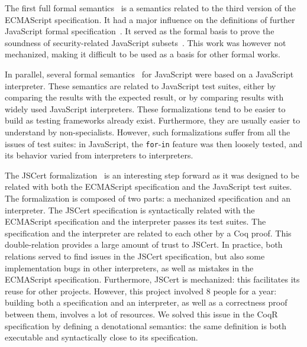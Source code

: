 \documentclass[
    sigplan,
    10pt,
    review, %
    natbib=false %
 ]{acmart}
\begin{document}
The first full formal semantics~\parencite{aplas08}
is a semantics related to the third version of the ECMAScript specification.
It had a major influence on the definitions of further JavaScript formal
specification~\parencite{ses, popl14jscert, popl12-Towards, usenix}.
It served as the formal basis to prove the soundness of security-related
JavaScript subsets~\parencite{MMT-CSF-TR09, mmt-esorics09, mmt-oakland10}.
This work was however not mechanized, making it difficult to be used
as a basis for other formal works.

In parallel, several formal semantics~\parencite{js-ml, Guha2010, Politz:S5, kjs}
for JavaScript were based on a JavaScript interpreter.
These semantics are related to JavaScript test suites,
either by comparing the results with the expected result,
or by comparing results with widely used JavaScript interpreters.
These formalizations tend to be easier to build
as testing frameworks already exist.
Furthermore, they are usually easier to understand by non-specialists.
However, such formalizations suffer from all the issues of test suites:
in JavaScript, the \texttt{for}-\texttt{in}
feature was then loosely tested,
and its behavior varied from interpreters to interpreters.

The JSCert formalization~\parencite{popl14jscert}
is an interesting step forward as it was designed
to be related with both the ECMAScript specification and the JavaScript test suites.
The formalization is composed of two parts:
a mechanized specification and an interpreter.
The JSCert specification is syntactically related with the ECMAScript specification
and the interpreter passes its test suites.
The specification and the interpreter are related to each other by a Coq proof.
This double-relation provides a large amount of trust to JSCert.
In practice, both relations served to find issues in the JSCert specification,
but also some implementation bugs in other interpreters,
as well as mistakes in the ECMAScript specification.
Furthermore, JSCert is mechanized:
this facilitates its reuse for other projects.
However, this project involved 8 people for a year:
building both a specification and an interpreter,
as well as a correctness proof between them, involves a lot of resources.
We solved this issue in the CoqR specification
by defining a denotational semantics:
the same definition is both executable and syntactically close to its specification.
\end{document}
